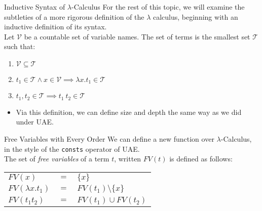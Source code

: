 \documentclass[11pt]{beamer}
\begin{document}
\begin{frame}[fragile=singleslide]{Inductive Syntax of $\lambda$-Calculus}
For the rest of this topic, we will examine the subtleties of a more rigorous definition of the $\lambda$ calculus, beginning with an inductive definition of its syntax. \\
\vspace{1em}
Let $\mathcal{V}$ be a countable set of variable names.  The set of terms is the smallest set $\mathcal{T}$ such that:
\begin{enumerate}
\item $\mathcal{V} \subseteq \mathcal{T}$
\item $t_1 \in \mathcal{T} \land x \in \mathcal{V} \implies \lambda x. t_1 \in \mathcal{T}$
\item $t_1, t_2 \in \mathcal{T} \implies t_1\:t_2 \in \mathcal{T}$
\end{enumerate}

\begin{itemize}
\item Via this definition, we can define size and depth the same way as we did under UAE.  
\end{itemize}

\end{frame}


\begin{frame}[fragile=singleslide]{Free Variables with Every Order}
We can define a new function over $\lambda$-Calculus, in the style of the \texttt{consts} operator of UAE.  \\
\vspace{1em}
The set of \emph{free variables} of a term $t$, written $FV(t)$ is defined as follows: \\
\vspace{0.5em}
\begin{tabular}{l l l}
$FV(x)$ & $=$ & $\{x\}$ \\
$FV(\lambda x.t_1)$ & $=$ & $FV(t_1) \setminus \{x\}$ \\
$FV(t_1 t_2)$ & $=$ & $FV(t_1) \cup FV(t_2)$ \\ 
\end{tabular}

\end{frame}
\end{document}
